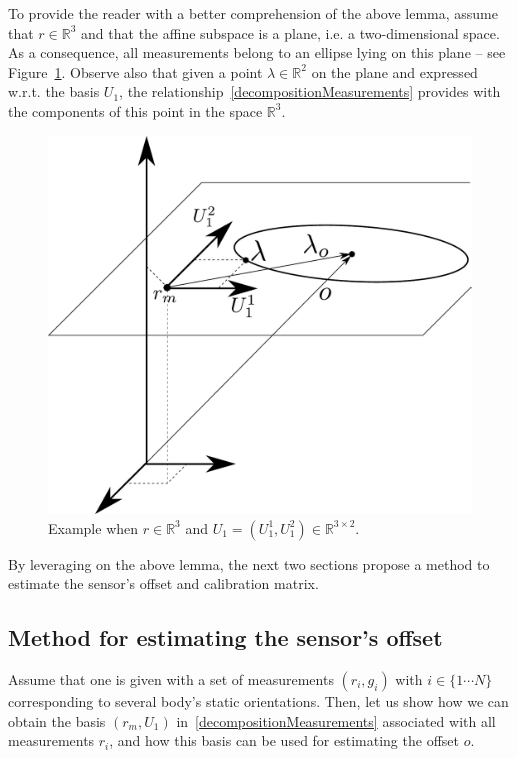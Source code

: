 To provide the reader with a better comprehension of the above lemma, assume that $r \in \mathbb{R}^{3}$ and that the affine subspace is 
a plane, i.e. a two-dimensional space. 
As a consequence, all measurements belong to an ellipse lying on this plane -- see Figure~\ref{imageWithPlane}. Observe also that given a point 
$\lambda \in \mathbb{R}^2$ on the plane and expressed w.r.t. the basis $U_1$, the relationship~\eqref{decompositionMeasurements} provides with the components of this point in the space 
$\mathbb{R}^3$.
\begin{figure}
\vspace{2em}
\centering
    \includegraphics[width=1.0\textwidth]{images/imageWithPlane.pdf}
    \caption{Example when $r \in \mathbb{R}^3$ and $U_1 = (U_1^1,U_1^2) \in \mathbb{R}^{3 \times 2}$. }
    \label{imageWithPlane}
\end{figure}
By leveraging on the above lemma, the next two sections propose a method to estimate the sensor's offset and calibration matrix.

\subsection{Method for estimating the sensor's offset}
\label{offsetEstimationTechnique}

Assume that one is given with a set of measurements $(r_i,g_i)$ with $i \in \{1 \cdots N \}$ corresponding to several body's static orientations. 
Then, let 
us show how we can obtain the basis $(r_m,U_1)$ in~\eqref{decompositionMeasurements} associated with all measurements $r_i$, and how this basis
can be used for estimating the offset $o$.

